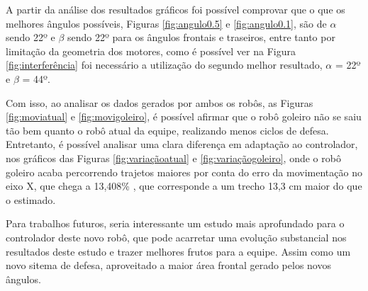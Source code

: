 \documentclass[deposito, acronym, symbols]{fei}
\begin{document}
A partir da análise dos resultados gráficos foi possível comprovar que o que os melhores ângulos possíveis, Figuras  \ref{fig:angulo0.5} e \ref{fig:angulo0.1}, são de $\alpha$ sendo 22º e $\beta$ sendo 22º para os ângulos frontais e traseiros, entre tanto por limitação da geometria dos motores, como é possível ver na Figura \ref{fig:interferência}  foi necessário a utilização do segundo melhor resultado, $\alpha$ = 22º e $\beta$ = 44º.

Com isso, ao analisar os dados gerados por ambos os robôs, as Figuras \ref{fig:moviatual} e \ref{fig:movigoleiro}, é possível afirmar que o robô goleiro não se saiu tão bem quanto o robô atual da equipe, realizando menos ciclos de defesa. Entretanto, é possível analisar uma clara diferença em adaptação ao controlador, nos gráficos das Figuras \ref{fig:variaçãoatual} e \ref{fig:variaçãogoleiro}, onde o robô goleiro acaba percorrendo trajetos maiores por conta do erro da movimentação no eixo X, que chega a 13,408\% , que corresponde a um trecho 13,3 cm maior do que o estimado.

Para trabalhos futuros, seria interessante um estudo mais aprofundado para o controlador deste novo robô, que pode acarretar uma evolução substancial nos resultados deste estudo e trazer melhores frutos para a equipe. Assim como um novo sitema de defesa, aproveitado a maior área frontal gerado pelos novos ângulos.  

\printbibliography

\appendix

\end{document}
